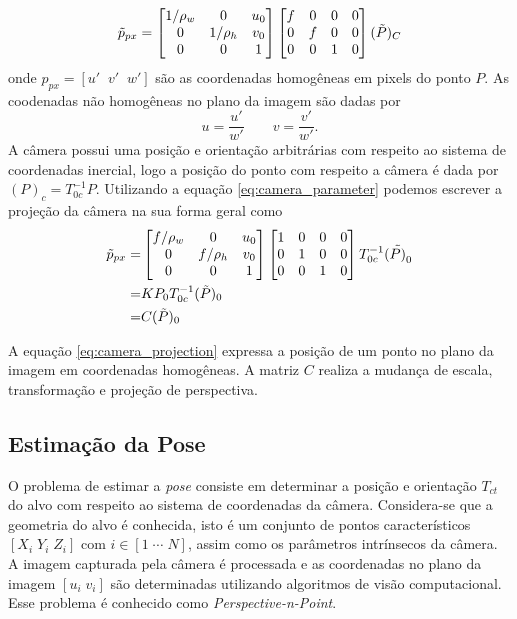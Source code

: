 \begin{equation} \label{eq:camera_parameter}
{\tilde{p}_{px}} = 
\begin{bmatrix}
	1/\rho_w & 0 & u_0 \\
	0        & 1/\rho_h &v_0 \\
	0 & 0 & 1 \\
\end{bmatrix}
\begin{bmatrix} f & 0 & 0 & 0\\
	 0 & f & 0 & 0\\
	 0 & 0 & 1 & 0	
\end{bmatrix}
(\tilde{{P}})_C
\end{equation}
onde $p_{px} = [u' \;\; v' \;\; w']$ são as coordenadas homogêneas em pixels do ponto $P$. As coodenadas não homogêneas no plano da imagem são dadas por
\begin{equation}
u = \frac{u'}{w'} \qquad v = \frac{v'}{w'}.
\end{equation} 
A câmera possui uma posição e orientação arbitrárias com respeito ao sistema de coordenadas inercial, logo a posição do ponto com respeito a câmera é dada por  $({P})_c = {T}_{0c}^{-1} {P}$. Utilizando a equação \eqref{eq:camera_parameter} podemos escrever a projeção da câmera na sua forma geral como
\begin{align}\label{eq:camera_projection}
{\tilde{p}_{px}} =& 
\begin{bmatrix}
	f/\rho_w & 0 & u_0 \\
	0        & f/\rho_h &v_0 \\
	0 & 0 & 1 \\
\end{bmatrix}
\begin{bmatrix}  1 & 0 & 0 & 0\\
	 0 & 1 & 0 & 0\\
	 0 & 0 & 1 & 0	
\end{bmatrix}
{T}_{0c}^{-1} (\tilde{{P})}_0\\
=& {K} {P}_0 {T}_{0c}^{-1} (\tilde{{P}})_0 \\ 
=& {C} ({\tilde{P})_0}
\end{align}

A equação \eqref{eq:camera_projection} expressa a posição de um ponto no plano da imagem em coordenadas homogêneas. A matriz $C$ realiza a mudança de escala, transformação e projeção de perspectiva. 


\subsection{Estimação da Pose}
O problema de estimar a \textit{pose} consiste em determinar a posição e orientação ${T}_{ct}$ do alvo com respeito ao sistema de coordenadas da câmera. Considera-se que a geometria do alvo é conhecida, isto é um conjunto de pontos característicos $[X_i \; Y_i \; Z_i]$ com $i \in [1\; \cdots \; N]$, assim como os parâmetros intrínsecos da câmera. A imagem capturada pela câmera é processada e as coordenadas no plano da imagem $[u_i\; v_i]$ são determinadas utilizando algoritmos de visão computacional. Esse problema é conhecido como \textit{Perspective-n-Point}.


